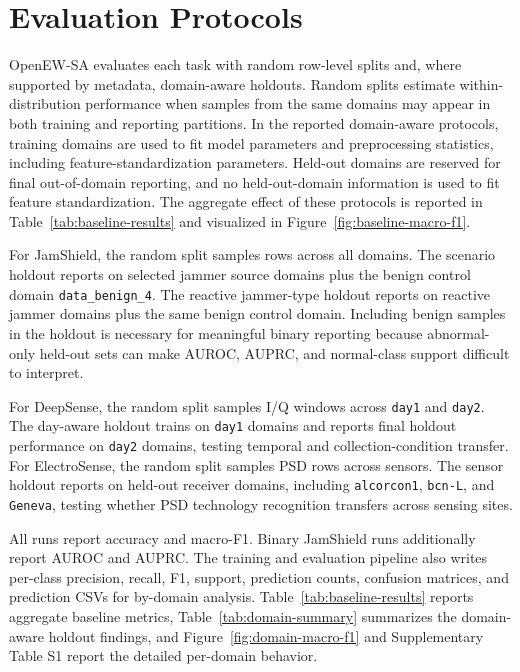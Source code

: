 \documentclass[11pt]{article}
\newcommand{\artifact}[1]{\texttt{#1}}
\begin{document}
\section{Evaluation Protocols}

OpenEW-SA evaluates each task with random row-level splits and, where supported by metadata, domain-aware holdouts. Random splits estimate within-distribution performance when samples from the same domains may appear in both training and reporting partitions. In the reported domain-aware protocols, training domains are used to fit model parameters and preprocessing statistics, including feature-standardization parameters. Held-out domains are reserved for final out-of-domain reporting, and no held-out-domain information is used to fit feature standardization. The aggregate effect of these protocols is reported in Table~\ref{tab:baseline-results} and visualized in Figure~\ref{fig:baseline-macro-f1}.

For JamShield, the random split samples rows across all domains. The scenario holdout reports on selected jammer source domains plus the benign control domain \artifact{data\_benign\_4}. The reactive jammer-type holdout reports on reactive jammer domains plus the same benign control domain. Including benign samples in the holdout is necessary for meaningful binary reporting because abnormal-only held-out sets can make AUROC, AUPRC, and normal-class support difficult to interpret.

For DeepSense, the random split samples I/Q windows across \artifact{day1} and \artifact{day2}. The day-aware holdout trains on \artifact{day1} domains and reports final holdout performance on \artifact{day2} domains, testing temporal and collection-condition transfer. For ElectroSense, the random split samples PSD rows across sensors. The sensor holdout reports on held-out receiver domains, including \artifact{alcorcon1}, \artifact{bcn-L}, and \artifact{Geneva}, testing whether PSD technology recognition transfers across sensing sites.

All runs report accuracy and macro-F1. Binary JamShield runs additionally report AUROC and AUPRC. The training and evaluation pipeline also writes per-class precision, recall, F1, support, prediction counts, confusion matrices, and prediction CSVs for by-domain analysis. Table~\ref{tab:baseline-results} reports aggregate baseline metrics, Table~\ref{tab:domain-summary} summarizes the domain-aware holdout findings, and Figure~\ref{fig:domain-macro-f1} and Supplementary Table S1 report the detailed per-domain behavior.
\end{document}
